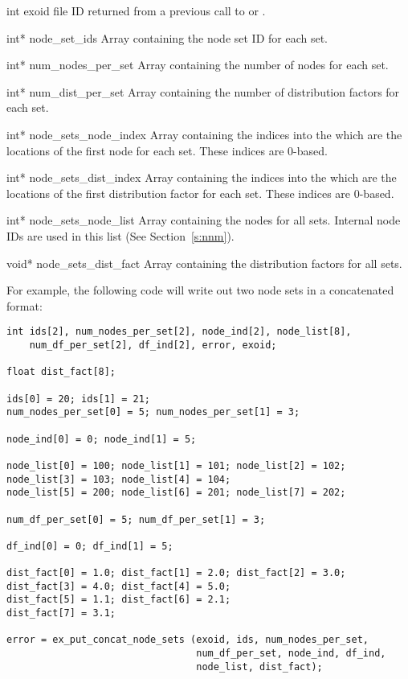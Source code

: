 \begin{parameters}
\item[{int exoid \R{}}]
\exo{} file ID returned from a previous call to 
or .

\item[{int* node_set_ids \R{}}]
Array containing the node set ID for each set.

\item[{int* num_nodes_per_set \R{}}]
Array containing the number of nodes for each set.

\item[{int* num_dist_per_set \R{}}]
Array containing the number of distribution factors for each set.

\item[{int* node_sets_node_index \R{}}]
Array containing the indices into the  which
are the locations of the first node for each set. These indices are
0-based.

\item[{int* node_sets_dist_index \R{}}]
Array containing the indices into the  which
are the locations of the first distribution factor for each set. These
indices are 0-based.

\item[{int* node_sets_node_list \R{}}]
Array containing the nodes for all sets. Internal node IDs are used in
this list (See Section~\ref{s:nnm}).

\item[{void* node_sets_dist_fact \R{}}]
Array containing the distribution factors for all sets.
\end{parameters}

For example, the following code will write out two node sets
in a concatenated format:

\begin{lstlisting}
int ids[2], num_nodes_per_set[2], node_ind[2], node_list[8],
    num_df_per_set[2], df_ind[2], error, exoid;

float dist_fact[8];

ids[0] = 20; ids[1] = 21;
num_nodes_per_set[0] = 5; num_nodes_per_set[1] = 3;

node_ind[0] = 0; node_ind[1] = 5;

node_list[0] = 100; node_list[1] = 101; node_list[2] = 102;
node_list[3] = 103; node_list[4] = 104;
node_list[5] = 200; node_list[6] = 201; node_list[7] = 202;

num_df_per_set[0] = 5; num_df_per_set[1] = 3;

df_ind[0] = 0; df_ind[1] = 5;

dist_fact[0] = 1.0; dist_fact[1] = 2.0; dist_fact[2] = 3.0;
dist_fact[3] = 4.0; dist_fact[4] = 5.0;
dist_fact[5] = 1.1; dist_fact[6] = 2.1;
dist_fact[7] = 3.1;

error = ex_put_concat_node_sets (exoid, ids, num_nodes_per_set,
                                 num_df_per_set, node_ind, df_ind,
                                 node_list, dist_fact);
\end{lstlisting}

